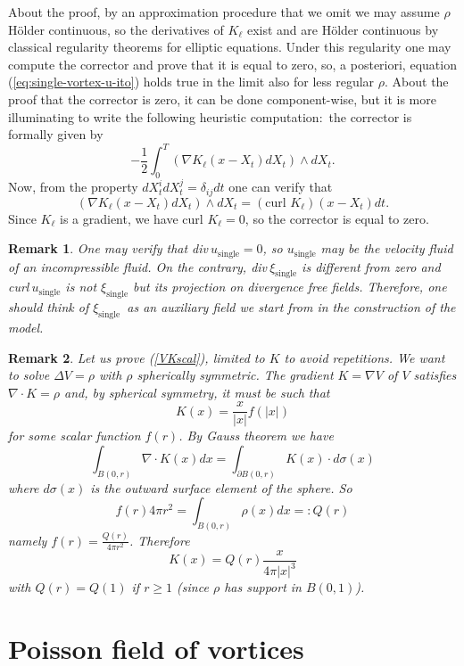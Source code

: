 \documentclass[a4paper,12pt]{article}
\newtheorem{remark}{Remark}
\begin{document}
About the proof, by an approximation procedure that we omit we may assume
$\rho$ H\"{o}lder continuous, so the derivatives of $K_{\ell}$ exist and are
H\"{o}lder continuous by classical regularity theorems for elliptic equations.
Under this regularity one may compute the corrector and prove that it is equal
to zero, so, a posteriori, equation (\ref{eq:single-vortex-u-ito}) holds true
in the limit also for less regular $\rho$. About the proof that the corrector
is zero, it can be done component-wise, but it is more illuminating to write
the following heuristic computation:\ the corrector is formally given by%
\[
-\frac{1}{2}\int_{0}^{T}\left(  \nabla K_{\ell}(x-X_{t})dX_{t}\right)  \wedge
dX_{t}.
\]
Now, from the property $dX_{t}^{i}dX_{t}^{j}=\delta_{ij}dt$ one can verify
that
\[
\left(  \nabla K_{\ell}(x-X_{t})dX_{t}\right)  \wedge dX_{t}=\left(
\text{curl }K_{\ell}\right)  (x-X_{t})dt.
\]
Since $K_{\ell}$ is a gradient, we have curl $K_{\ell}=0$, so the corrector is
equal to zero.

\begin{remark}
One may verify that div$~u_{\text{single}}=0$, so $u_{\text{single}}$ may be
the velocity fluid of an incompressible fluid. On the contrary, div$~\xi
_{\text{single}}$ is different from zero and curl$~u_{\text{single}}$ is not
$\xi_{\text{single}}$ but its projection on divergence free fields. Therefore,
one should think of $\xi_{\text{single}}$\ as an auxiliary field we start from
in the construction of the model.
\end{remark}

\begin{remark}
\label{formulaK}Let us prove (\ref{VKscal}), limited to $K$ to avoid
repetitions. We want to solve $\Delta V=\rho$ with $\rho$ spherically
symmetric. The gradient $K=\nabla V$ of $V$ satisfies $\nabla\cdot K=\rho$
and, by spherical symmetry, it must be such that
\[
K(x)=\frac{x}{|x|}f(|x|)
\]
for some scalar function $f(r)$. By Gauss theorem we have
\[
\int_{B(0,r)}\nabla\cdot K(x)dx=\int_{\partial B(0,r)}K(x)\cdot d\sigma(x)
\]
where $d\sigma(x)$ is the outward surface element of the sphere. So
\[
f(r)4\pi r^{2}=\int_{B(0,r)}\rho(x)dx=:Q(r)
\]
namely $f(r)=\frac{Q(r)}{4\pi r^{2}}$. Therefore
\[
K(x)=Q(r)\frac{x}{4\pi|x|^{3}}%
\]
with $Q(r)=Q(1)$ if $r\geq1$ (since $\rho$ has support in $B(0,1)$).
\end{remark}

\section{Poisson field of vortices}
\end{document}
